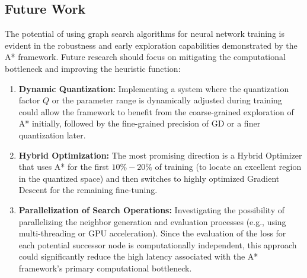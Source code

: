 \subsection{Future Work}
\label{sec:future_work}

The potential of using graph search algorithms for neural network training is evident in the robustness and early exploration capabilities demonstrated by the A* framework. Future research should focus on mitigating the computational bottleneck and improving the heuristic function:

\begin{enumerate}
    \item \textbf{Dynamic Quantization:} Implementing a system where the quantization factor $Q$ or the parameter range is dynamically adjusted during training could allow the framework to benefit from the coarse-grained exploration of A* initially, followed by the fine-grained precision of GD or a finer quantization later.
    \item \textbf{Hybrid Optimization:} The most promising direction is a Hybrid Optimizer that uses A* for the first $10\%-20\%$ of training (to locate an excellent region in the quantized space) and then switches to highly optimized Gradient Descent for the remaining fine-tuning.
    \item \textbf{Parallelization of Search Operations:} Investigating the possibility of parallelizing the neighbor generation and evaluation processes (e.g., using multi-threading or GPU acceleration). Since the evaluation of the loss for each potential successor node is computationally independent, this approach could significantly reduce the high latency associated with the A* framework's primary computational bottleneck.
\end{enumerate}